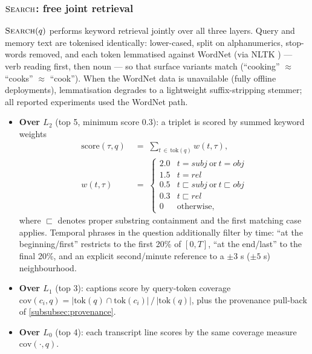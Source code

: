 \subsubsection{$\textsc{Search}$: free joint retrieval}
\label{subsubsec:search}

$\textsc{Search}(q)$ performs keyword retrieval jointly over all three layers. Query and memory
text are tokenised identically: lower-cased, split on alphanumerics, stop-words removed, and each
token lemmatised against WordNet \cite{miller1995wordnet} (via NLTK \cite{bird2009nltk}) --- verb reading
first, then noun --- so that surface variants match (``cooking'' $\approx$ ``cooks'' $\approx$ ``cook''). When the
WordNet data is unavailable (fully offline deployments), lemmatisation degrades to a lightweight
suffix-stripping stemmer; all reported experiments used the WordNet path.

\begin{itemize}
  \item \textbf{Over $L_2$} (top 5, minimum score 0.3): a triplet is scored by summed keyword weights
  \begin{equation}
  \label{eq:score}
  \begin{aligned}
  \mathrm{score}(\tau, q) &\;=\; \sum_{t \,\in\, \mathrm{tok}(q)} w(t, \tau), \\[2pt]
  w(t, \tau) &\;=\; \begin{cases}
  2.0 & t = \mathit{subj} \ \text{or}\ t = \mathit{obj} \\
  1.5 & t = \mathit{rel} \\
  0.5 & t \sqsubset \mathit{subj} \ \text{or}\ t \sqsubset \mathit{obj} \\
  0.3 & t \sqsubset \mathit{rel} \\
  0 & \text{otherwise,}
  \end{cases}
  \end{aligned}
  \end{equation}
  where $\sqsubset$ denotes proper substring containment and the first matching case applies.
  Temporal phrases in the question additionally filter by time: ``at the beginning/first''
  restricts to the first 20\% of $[0,T]$, ``at the end/last'' to the final 20\%, and an explicit
  second/minute reference to a $\pm 3$ s ($\pm 5$ s) neighbourhood.
  \item \textbf{Over $L_1$} (top 3): captions score by query-token coverage
  $\mathrm{cov}(c_i, q) = |\mathrm{tok}(q) \cap \mathrm{tok}(c_i)| \,/\, |\mathrm{tok}(q)|$,
  plus the provenance pull-back of \cref{subsubsec:provenance}.
  \item \textbf{Over $L_0$} (top 4): each transcript line scores by the same coverage measure
  $\mathrm{cov}(\cdot, q)$.
\end{itemize}

